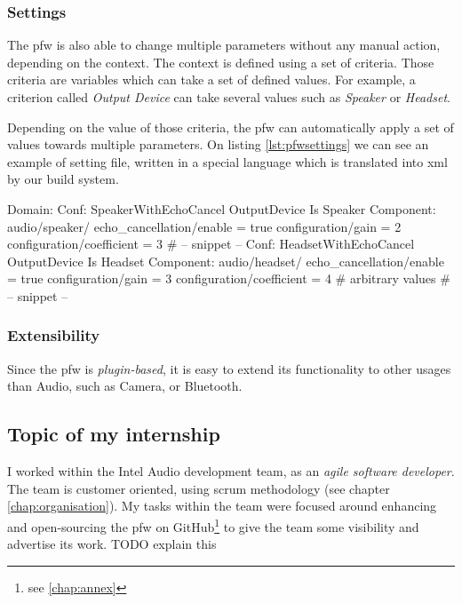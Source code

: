 \subsubsection{Settings}
The \gls{pfw} is also able to change multiple parameters without any manual action, depending on the context.
The context is defined using a set of criteria. Those criteria are variables which can take a set of defined values.
For example, a criterion called \emph{Output Device} can take several values such as \emph{Speaker} or \emph{Headset}.

Depending on the value of those criteria, the \gls{pfw} can automatically apply a set of values towards
multiple parameters.
On listing \ref{lst:pfwsettings} we can see an example of setting file, written in a special language
which is translated into \gls{xml} by our build system.

\begin{code}[language=pfwLang, caption=Settings file example, label=lst:pfwsettings]
Domain:
    Conf: SpeakerWithEchoCancel
        OutputDevice Is Speaker
        Component: audio/speaker/
            echo_cancellation/enable = true
            configuration/gain = 2
            configuration/coefficient = 3
        # -- snippet --
    Conf: HeadsetWithEchoCancel
        OutputDevice Is Headset
        Component: audio/headset/
            echo_cancellation/enable = true
            configuration/gain = 3
            configuration/coefficient = 4 # arbitrary values
        # -- snippet --
\end{code}

\subsubsection{Extensibility}
Since the \gls{pfw} is \emph{plugin-based}, it is easy to extend its functionality to other usages than Audio, such
as Camera, or Bluetooth.


\subsection{Topic of my internship}
I worked within the Intel Audio development team, as an \emph{agile
software developer}. The team is customer oriented, using \gls{scrum}
methodology (see chapter \ref{chap:organisation}). My tasks
within the team were focused around enhancing and open-sourcing the \gls{pfw} on
\gls{GitHub}\footnote{see \ref{chap:annex}} to give the team some
visibility and advertise its work.
TODO explain this

